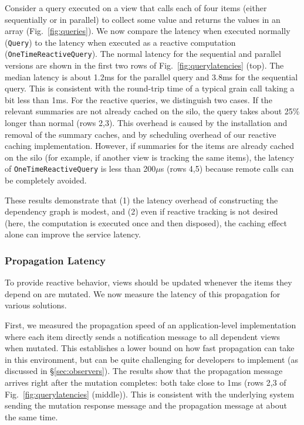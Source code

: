 Consider a query executed on a view that calls each of four items (either sequentially or in parallel) to collect some value and returns the values in an array (Fig.~\ref{fig:queries}). We now compare the latency when executed normally (\lstinline|Query|) to the latency when executed as a reactive computation (\lstinline|OneTimeReactiveQuery|). The normal latency for the sequential and parallel versions are shown in the first two rows of Fig.~\ref{fig:querylatencies} (top). The median latency is about 1.2ms for the parallel query and 3.8ms for the sequential query. This is consistent with the round-trip time of a typical grain call taking a bit less than 1ms. For the reactive queries, we distinguish two cases. If  the relevant summaries are not already cached on the silo, the query takes about 25\% longer than normal (rows 2,3). This overhead is caused by the installation and removal of the summary caches, and by scheduling overhead of our reactive caching implementation. However, if summaries for the items are already cached on the silo (for example, if another view is tracking the same items), the latency of \lstinline|OneTimeReactiveQuery| is less than 200$\mu$s (rows 4,5) because remote calls can be completely avoided. 

These results demonstrate that (1) the latency overhead of constructing the dependency graph is modest, and (2) even if reactive tracking is not desired (here, the computation is executed once and then disposed), the caching effect alone can improve the service latency.


\subsubsection{Propagation Latency}

To provide reactive behavior, views should be updated whenever the items they depend on are mutated. We now measure the latency of this propagation for various solutions.

First, we measured the propagation speed of an application-level implementation where each item directly sends a notification message to all dependent views when mutated. This establishes a lower bound on how fast propagation can take in this environment, but can be quite challenging for developers to implement (as discussed in \S\ref{sec:observers}). The results show that the propagation message arrives right after the mutation completes: both take close to 1ms (rows 2,3 of Fig.~\ref{fig:querylatencies} (middle)). This is consistent with the underlying system sending the mutation response message and the propagation message at about the same time. 

